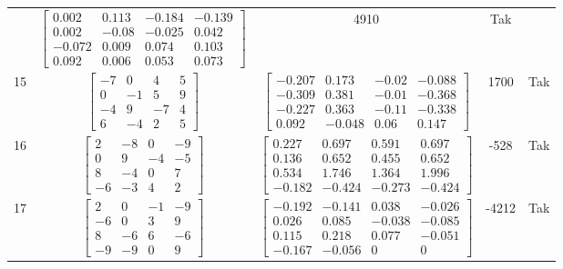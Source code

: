 \documentclass[a4paper,12pt]{article}
\begin{document}
\begin{tabular}{c c c c c}
&
$\begin{bmatrix} 0.002 & 0.113 & -0.184 & -0.139 \\ 0.002 & -0.08 & -0.025 & 0.042 \\ -0.072 & 0.009 & 0.074 & 0.103 \\ 0.092 & 0.006 & 0.053 & 0.073 \end{bmatrix}$
&
4910
&
Tak
\\
15
&
$\begin{bmatrix} -7 & 0 & 4 & 5 \\ 0 & -1 & 5 & 9 \\ -4 & 9 & -7 & 4 \\ 6 & -4 & 2 & 5 \end{bmatrix}$
&
$\begin{bmatrix} -0.207 & 0.173 & -0.02 & -0.088 \\ -0.309 & 0.381 & -0.01 & -0.368 \\ -0.227 & 0.363 & -0.11 & -0.338 \\ 0.092 & -0.048 & 0.06 & 0.147 \end{bmatrix}$
&
1700
&
Tak
\\
16
&
$\begin{bmatrix} 2 & -8 & 0 & -9 \\ 0 & 9 & -4 & -5 \\ 8 & -4 & 0 & 7 \\ -6 & -3 & 4 & 2 \end{bmatrix}$
&
$\begin{bmatrix} 0.227 & 0.697 & 0.591 & 0.697 \\ 0.136 & 0.652 & 0.455 & 0.652 \\ 0.534 & 1.746 & 1.364 & 1.996 \\ -0.182 & -0.424 & -0.273 & -0.424 \end{bmatrix}$
&
-528
&
Tak
\\
17
&
$\begin{bmatrix} 2 & 0 & -1 & -9 \\ -6 & 0 & 3 & 9 \\ 8 & -6 & 6 & -6 \\ -9 & -9 & 0 & 9 \end{bmatrix}$
&
$\begin{bmatrix} -0.192 & -0.141 & 0.038 & -0.026 \\ 0.026 & 0.085 & -0.038 & -0.085 \\ 0.115 & 0.218 & 0.077 & -0.051 \\ -0.167 & -0.056 & 0 & 0 \end{bmatrix}$
&
-4212
&
Tak
\\

\end{tabular}
\end{document}
